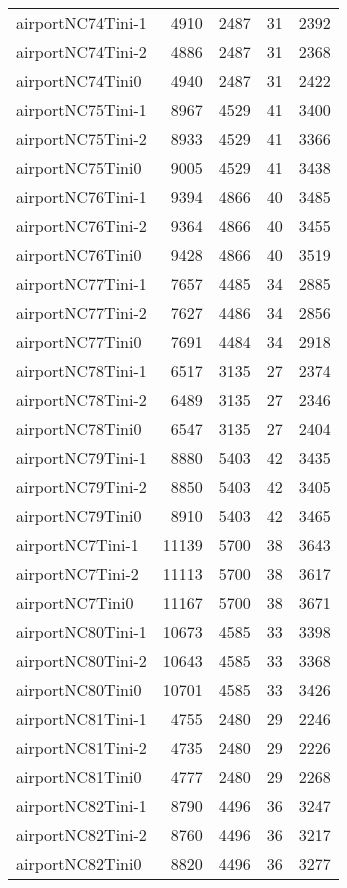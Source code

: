 \begin{longtable}{lrrrr}
airportNC74Tini-1 & 4910 & 2487 & 31 & 2392 \\
airportNC74Tini-2 & 4886 & 2487 & 31 & 2368 \\
airportNC74Tini0 & 4940 & 2487 & 31 & 2422 \\
airportNC75Tini-1 & 8967 & 4529 & 41 & 3400 \\
airportNC75Tini-2 & 8933 & 4529 & 41 & 3366 \\
airportNC75Tini0 & 9005 & 4529 & 41 & 3438 \\
airportNC76Tini-1 & 9394 & 4866 & 40 & 3485 \\
airportNC76Tini-2 & 9364 & 4866 & 40 & 3455 \\
airportNC76Tini0 & 9428 & 4866 & 40 & 3519 \\
airportNC77Tini-1 & 7657 & 4485 & 34 & 2885 \\
airportNC77Tini-2 & 7627 & 4486 & 34 & 2856 \\
airportNC77Tini0 & 7691 & 4484 & 34 & 2918 \\
airportNC78Tini-1 & 6517 & 3135 & 27 & 2374 \\
airportNC78Tini-2 & 6489 & 3135 & 27 & 2346 \\
airportNC78Tini0 & 6547 & 3135 & 27 & 2404 \\
airportNC79Tini-1 & 8880 & 5403 & 42 & 3435 \\
airportNC79Tini-2 & 8850 & 5403 & 42 & 3405 \\
airportNC79Tini0 & 8910 & 5403 & 42 & 3465 \\
airportNC7Tini-1 & 11139 & 5700 & 38 & 3643 \\
airportNC7Tini-2 & 11113 & 5700 & 38 & 3617 \\
airportNC7Tini0 & 11167 & 5700 & 38 & 3671 \\
airportNC80Tini-1 & 10673 & 4585 & 33 & 3398 \\
airportNC80Tini-2 & 10643 & 4585 & 33 & 3368 \\
airportNC80Tini0 & 10701 & 4585 & 33 & 3426 \\
airportNC81Tini-1 & 4755 & 2480 & 29 & 2246 \\
airportNC81Tini-2 & 4735 & 2480 & 29 & 2226 \\
airportNC81Tini0 & 4777 & 2480 & 29 & 2268 \\
airportNC82Tini-1 & 8790 & 4496 & 36 & 3247 \\
airportNC82Tini-2 & 8760 & 4496 & 36 & 3217 \\
airportNC82Tini0 & 8820 & 4496 & 36 & 3277 \\

\end{longtable}
